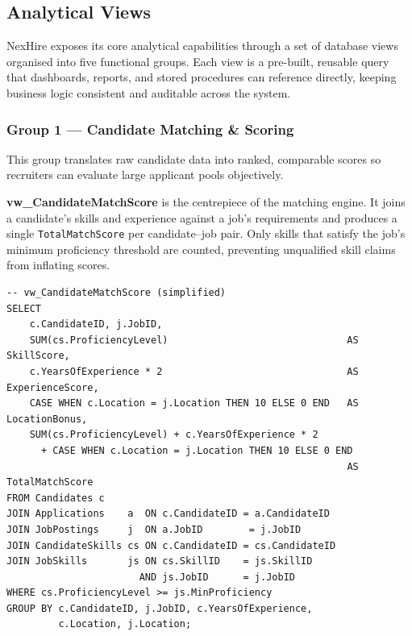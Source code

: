 \documentclass[11pt,a4paper]{article}
\begin{document}

\subsection{Analytical Views}

NexHire exposes its core analytical capabilities through a set of database views organised into five functional groups. Each view is a pre-built, reusable query that dashboards, reports, and stored procedures can reference directly, keeping business logic consistent and auditable across the system.

\subsubsection{Group 1 — Candidate Matching \& Scoring}

This group translates raw candidate data into ranked, comparable scores so recruiters can evaluate large applicant pools objectively.

\textbf{vw\_CandidateMatchScore} is the centrepiece of the matching engine. It joins a candidate's skills and experience against a job's requirements and produces a single \texttt{TotalMatchScore} per candidate–job pair. Only skills that satisfy the job's minimum proficiency threshold are counted, preventing unqualified skill claims from inflating scores.

\begin{verbatim}
-- vw_CandidateMatchScore (simplified)
SELECT
    c.CandidateID, j.JobID,
    SUM(cs.ProficiencyLevel)                               AS SkillScore,
    c.YearsOfExperience * 2                                AS ExperienceScore,
    CASE WHEN c.Location = j.Location THEN 10 ELSE 0 END   AS LocationBonus,
    SUM(cs.ProficiencyLevel) + c.YearsOfExperience * 2
      + CASE WHEN c.Location = j.Location THEN 10 ELSE 0 END
                                                           AS TotalMatchScore
FROM Candidates c
JOIN Applications    a  ON c.CandidateID = a.CandidateID
JOIN JobPostings     j  ON a.JobID        = j.JobID
JOIN CandidateSkills cs ON c.CandidateID = cs.CandidateID
JOIN JobSkills       js ON cs.SkillID    = js.SkillID
                       AND js.JobID      = j.JobID
WHERE cs.ProficiencyLevel >= js.MinProficiency
GROUP BY c.CandidateID, j.JobID, c.YearsOfExperience,
         c.Location, j.Location;
\end{verbatim}
\end{document}
